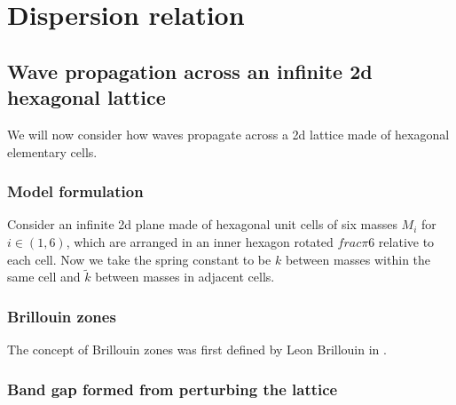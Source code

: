 \chapter{Dispersion relation}

\section{Wave propagation across an infinite 2d hexagonal lattice}
We will now consider how waves propagate across a 2d lattice made of hexagonal elementary cells. 

\subsection{Model formulation}
Consider an infinite 2d plane made of hexagonal unit cells of six masses $M_i$
for $i\in\left(1,6\right)$, which are arranged in an inner hexagon rotated
$frac{\pi}{6}$ relative to each cell. Now we take the spring constant to be $k$
between masses within the same cell and $\tilde{k}$ between masses in adjacent
cells.

\subsection{Brillouin zones}
The concept of Brillouin zones was first defined by Leon Brillouin in
\cite{brillouin}.

\subsection{Band gap formed from perturbing the lattice}
